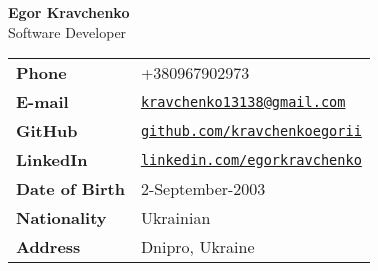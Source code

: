 \textbf{\LARGE Egor Kravchenko} \\
Software Developer
\hspace*{0.55\textwidth}
\begin{tabular*}{\textwidth}{ll}
    \textbf{Phone}         & +380967902973                                                                      \\
    \textbf{E-mail}        & \href{mailto:kravchenko13138@gmail.com}{\verb"kravchenko13138@gmail.com"}                   \\
    \textbf{GitHub}        & \href{https://github.com/kravchenkoegorii}{\verb"github.com/kravchenkoegorii"}            \\
    \textbf{LinkedIn}      & \href{https://www.linkedin.com/in/egorkravchenko}{\verb"linkedin.com/egorkravchenko"} \\
    \textbf{Date of Birth} & 2-September-2003                                                                      \\
    \textbf{Nationality}   & Ukrainian                                                                         \\
    \textbf{Address}       & Dnipro, Ukraine
\end{tabular*}